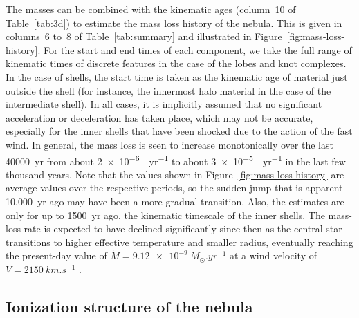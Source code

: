 \documentclass[useAMS, usenatbib]{mnras}
\begin{document}
The masses can be combined with the kinematic ages (column~10 of Table~\ref{tab:3d}) to estimate the mass loss history of the nebula.
This is given in columns~6 to~8 of Table~\ref{tab:summary} and illustrated in Figure~\ref{fig:mass-loss-history}.
For the start and end times of each component, we take the full range of kinematic times of discrete features in the case of the lobes and knot complexes.
In the case of shells, the start time is taken as the kinematic age of material just outside the shell (for instance, the innermost halo material in the case of the intermediate shell).
In all cases, it is implicitly assumed that no significant acceleration or deceleration has taken place,
which may not be accurate, especially for the inner shells that have been shocked due to the action of the fast wind.
In general, the mass loss is seen to increase monotonically over the last \SI{40000}{yr} from about \SI{2e-6}{\msun.yr^{-1}} to about \SI{3e-5}{\msun.yr^{-1}} in the last few thousand years.
Note that the values shown in Figure~\ref{fig:mass-loss-history} are average values over the respective periods,
so the sudden jump that is apparent \SI{10,000}{yr} ago may have been a more gradual transition.
Also, the estimates are only for up to \SI{1500}{yr} ago, the kinematic timescale of the inner shells.
The mass-loss rate is expected to have declined significantly since then as the central star transitions to higher effective temperature and smaller radius,
eventually reaching the present-day value of \(\dot{M} = \SI{9.12e-9}{M_\odot.yr^{-1}}\) at a wind velocity of \(V = \SI{2150}{km.s^{-1}}\) \citep{Herald:2011a}.


\subsection{Ionization structure of the nebula}
\label{sec:ioniz-struct-nebula}
\end{document}
